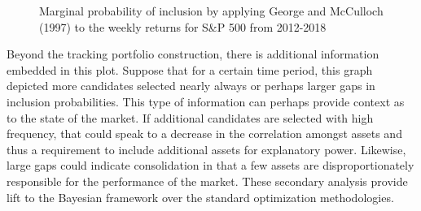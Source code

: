 \documentclass[a4paper, 12pt]{article}
\theoremstyle{plain}
\theoremstyle{definition}
\theoremstyle{remark}
\begin{document}
\begin{figure}[H]
\hfill
{}
\caption{Marginal probability of inclusion by applying George and McCulloch (1997) to the weekly returns for S\&P 500 from 2012-2018 }
\end{figure}

Beyond the tracking portfolio construction, there is additional information embedded in this plot. Suppose that for a certain time period, this graph depicted more candidates selected nearly always or perhaps larger gaps in inclusion probabilities. This type of information can perhaps provide context as to the state of the market. If additional candidates are selected with high frequency, that could speak to a decrease in the correlation amongst assets and thus a requirement to include additional assets for explanatory power. Likewise, large gaps could indicate consolidation in that a few assets are disproportionately responsible for the performance of the market. These secondary analysis provide lift to the Bayesian framework over the standard optimization methodologies.
\end{document}
